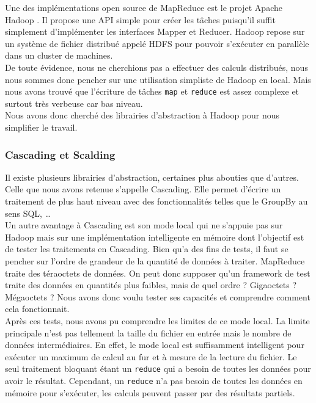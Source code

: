 Une des implémentations open source de MapReduce est le projet Apache Hadoop \cite{hadoop}. Il propose une API simple pour créer les tâches puisqu'il suffit simplement d'implémenter les interfaces Mapper et Reducer. Hadoop repose sur un système de fichier distribué appelé HDFS pour pouvoir s'exécuter en parallèle dans un cluster de machines.\\

De toute évidence, nous ne cherchions pas a effectuer des calculs distribués, nous nous sommes donc pencher sur une utilisation simpliste de Hadoop en local. Mais nous avons trouvé que l'écriture de tâches \verb+map+ et \verb+reduce+ est assez complexe et surtout très verbeuse car bas niveau.\\

Nous avons donc cherché des librairies d'abstraction à Hadoop pour nous simplifier le travail.

\subsubsection{Cascading et Scalding}

Il existe plusieurs librairies d'abstraction, certaines plus abouties que d'autres. Celle que nous avons retenue s'appelle Cascading. Elle permet d'écrire un traitement de plus haut niveau avec des fonctionnalités telles que le GroupBy au sens SQL, \dots{}\\

Un autre avantage à Cascading est son mode local qui ne s'appuie pas sur Hadoop mais sur une implémentation intelligente en mémoire dont l'objectif est de tester les traitements en Cascading. Bien qu'a des fins de tests, il faut se pencher sur l'ordre de grandeur de la quantité de données à traiter. MapReduce traite des téraoctets de données. On peut donc supposer qu'un framework de test traite des données en quantités plus faibles, mais de quel ordre ? Gigaoctets ? Mégaoctets ? Nous avons donc voulu tester ses capacités et comprendre comment cela fonctionnait.\\

Après ces tests, nous avons pu comprendre les limites de ce mode local. La limite principale n'est pas tellement la taille du fichier en entrée mais le nombre de données intermédiaires. En effet, le mode local est suffisamment intelligent pour exécuter un maximum de calcul au fur et à mesure de la lecture du fichier. Le seul traitement bloquant étant un \verb+reduce+ qui a besoin de toutes les données pour avoir le résultat. Cependant, un \verb+reduce+ n'a pas besoin de toutes les données en mémoire pour s'exécuter, les calculs peuvent passer par des résultats partiels.\\

